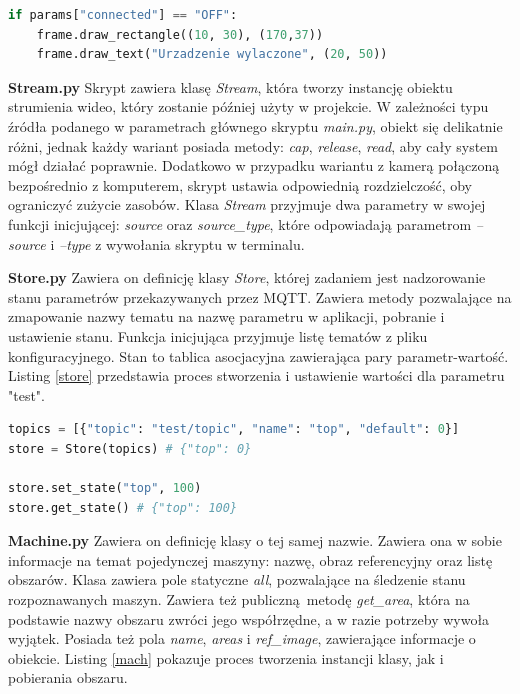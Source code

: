 \documentclass[12pt,twoside,polish]{article}
\begin{document}
\begin{lstlisting}[language=Python,caption=Uruchomienie systemu,label=draw_fn]
if params["connected"] == "OFF":
	frame.draw_rectangle((10, 30), (170,37))
	frame.draw_text("Urzadzenie wylaczone", (20, 50))
\end{lstlisting}

\textbf{Stream.py}
Skrypt zawiera klasę \emph{Stream}, która tworzy instancję obiektu strumienia wideo, który zostanie później użyty w projekcie. W zależności typu źródła podanego w parametrach głównego skryptu \emph{main.py}, obiekt się delikatnie różni, jednak każdy wariant posiada metody: \emph{cap}, \emph{release}, \emph{read}, aby cały system mógł działać poprawnie. Dodatkowo w przypadku wariantu z kamerą połączoną bezpośrednio z komputerem, skrypt ustawia odpowiednią rozdzielczość, oby ograniczyć zużycie zasobów. Klasa \emph{Stream} przyjmuje dwa parametry w swojej funkcji inicjującej: \emph{source} oraz \emph{source\_type}, które odpowiadają parametrom \emph{--source} i \emph{--type} z wywołania skryptu w terminalu.


\textbf{Store.py}
Zawiera on definicję klasy \emph{Store}, której zadaniem jest nadzorowanie stanu parametrów przekazywanych przez MQTT. Zawiera metody pozwalające na zmapowanie nazwy tematu na nazwę parametru w aplikacji, pobranie i ustawienie stanu. Funkcja inicjująca przyjmuje listę tematów z pliku konfiguracyjnego. Stan to tablica asocjacyjna zawierająca pary parametr-wartość. Listing \ref{store} przedstawia proces stworzenia i ustawienie wartości dla parametru "test".

\begin{lstlisting}[language=Python,label=store,caption=Uruchomienie systemu]
topics = [{"topic": "test/topic", "name": "top", "default": 0}]
store = Store(topics) # {"top": 0}

store.set_state("top", 100)
store.get_state() # {"top": 100}
\end{lstlisting}

\textbf{Machine.py}
Zawiera on definicję klasy o tej samej nazwie. Zawiera ona w sobie informacje na temat pojedynczej maszyny: nazwę, obraz referencyjny oraz listę obszarów. Klasa zawiera pole statyczne \emph{all}, pozwalające na śledzenie stanu rozpoznawanych maszyn. Zawiera też publiczną metodę \emph{get\_area}, która na podstawie nazwy obszaru zwróci jego współrzędne, a w razie potrzeby wywoła wyjątek. Posiada też pola \emph{name}, \emph{areas} i \emph{ref\_image}, zawierające informacje o obiekcie. Listing \ref{mach} pokazuje proces tworzenia instancji klasy, jak i pobierania obszaru.
\end{document}

